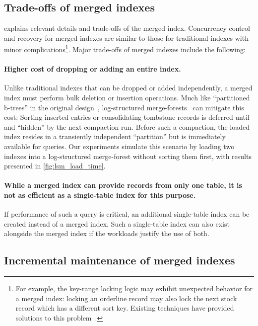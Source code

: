 \documentclass[biblatex, english]{lni}
\begin{document}
\subsection{Trade-offs of merged indexes}

 explains relevant details and trade-offs of the merged index.
Concurrency control and recovery for merged indexes are similar to those for traditional indexes with minor complications\footnote{
     For example, the key-range locking logic may exhibit unexpected behavior for a merged index: locking an orderline record may also lock the next stock record which has a different sort key.
    Existing techniques have provided solutions to this problem~\cite{graefe2007locking}.
}.
Major trade-offs of merged indexes include the following:

\paragraph{Higher cost of dropping or adding an entire index.} Unlike traditional indexes that can be dropped or added independently, a merged index must perform bulk deletion or insertion operations. Much like ``partitioned b-trees'' in the original design~\cite{graefe2007merged}, log-structured merge-forests~\cite{ONeil1996LSMTree,Jagadish1997LSM} can mitigate this cost: Sorting inserted entries or consolidating tombstone records is deferred until and ``hidden'' by the next compaction run. 
Before such a compaction, the loaded index resides in a transiently independent ``partition'' but is immediately available for queries.
Our experiments simulate this scenario by loading two indexes into a log-structured merge-forest without sorting them first, with results presented in \cref{fig:lsm_load_time}.
 
\paragraph{While a merged index can provide records from only one table, it is not as efficient as a single-table index for this purpose.}
If performance of such a query is critical, an additional single-table index can be created instead of a merged index. 
Such a single-table index can also exist alongside the merged index if the workloads justify the use of both. 

\subsection{Incremental maintenance of merged indexes}
\end{document}
